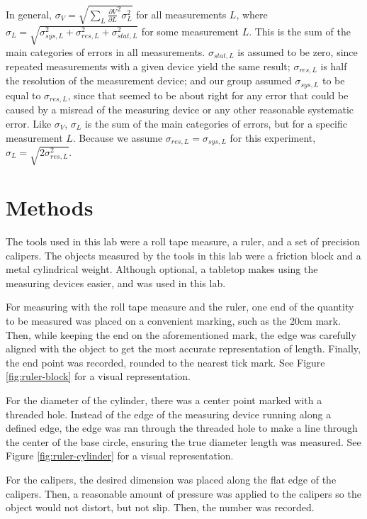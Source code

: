 \documentclass[12pt]{article}
\begin{document}
In general, \(\sigma_{V}= \sqrt{\sum_{L} \frac{\partial V}{\partial L}^{2}\sigma_{L}^{2}}\) for all measurements \(L\), where \(\sigma_{L}=\sqrt{\sigma_{sys,L}^{2}+\sigma_{res,L}^{2}+\sigma_{stat,L}^{2}}\) for some measurement \(L\). This is the sum of the main categories of errors in all measurements. \(\sigma_{stat,L}\) is assumed to be zero, since repeated measurements with a given device yield the same result; \(\sigma_{res,L}\) is half the resolution of the measurement device; and our group assumed \(\sigma_{sys,L}\) to be equal to \(\sigma_{res,L}\), since that seemed to be about right for any error that could be caused by a misread of the measuring device or any other reasonable systematic error. Like \(\sigma_{V}\), \(\sigma_{L}\) is the sum of the main categories of errors, but for a specific measurement \(L\). Because we assume \(\sigma_{res,L}=\sigma_{sys,L}\) for this experiment, \(\sigma_{L}=\sqrt{2\sigma_{res,L}^{2}}\).
\section{Methods}
\label{sec:org0e85c2b}

The tools used in this lab were a roll tape measure, a ruler, and a set of precision calipers. The objects measured by the tools in this lab were a friction block and a metal cylindrical weight. Although optional, a tabletop makes using the measuring devices easier, and was used in this lab.

For measuring with the roll tape measure and the ruler, one end of the quantity to be measured was placed on a convenient marking, such as the 20cm mark. Then, while keeping the end on the aforementioned mark, the edge was carefully aligned with the object to get the most accurate representation of length. Finally, the end point was recorded, rounded to the nearest tick mark. See Figure \ref{fig:ruler-block} for a visual representation.

For the diameter of the cylinder, there was a center point marked with a threaded hole. Instead of the edge of the measuring device running along a defined edge, the edge was ran through the threaded hole to make a line through the center of the base circle, ensuring the true diameter length was measured. See Figure \ref{fig:ruler-cylinder} for a visual representation.

For the calipers, the desired dimension was placed along the flat edge of the calipers. Then, a reasonable amount of pressure was applied to the calipers so the object would not distort, but not slip. Then, the number was recorded.
\end{document}
